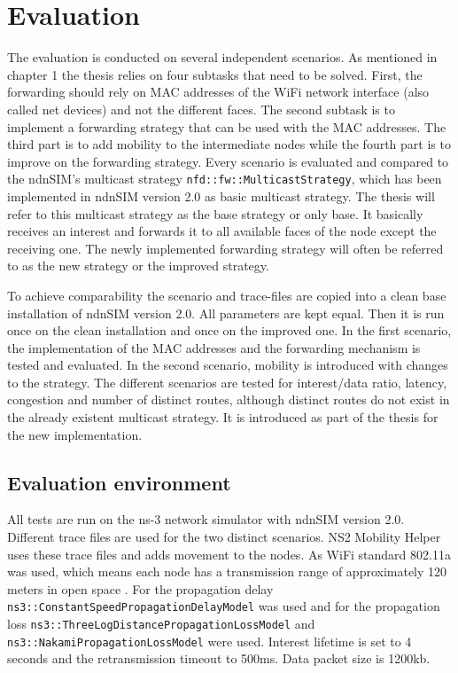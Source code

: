 \chapter{Evaluation}

The evaluation is conducted on several independent scenarios. As mentioned in chapter 1 the thesis relies on four subtasks that need to be solved. First, the forwarding should rely on MAC addresses of the WiFi network interface (also called net devices) and not the different faces. The second subtask is to implement a forwarding strategy that can be used with the MAC addresses. The third part is to add mobility to the intermediate nodes while the fourth part is to improve on the forwarding strategy. Every scenario is evaluated and compared to the ndnSIM's multicast strategy \texttt{nfd::fw::MulticastStrategy}, which has been implemented in ndnSIM version 2.0 as basic multicast strategy. The thesis will refer to this multicast strategy as the base strategy or only base. It basically receives an interest and forwards it to all available faces of the node except the receiving one. The newly implemented forwarding strategy will often be referred to as the new strategy or the improved strategy.

To achieve comparability the scenario and trace-files are copied into a clean base installation of ndnSIM version 2.0. All parameters are kept equal. Then it is run once on the clean installation and once on the improved one. In the first scenario, the implementation of the MAC addresses and the forwarding mechanism is tested and evaluated. In the second scenario, mobility is introduced with changes to the strategy. The different scenarios are tested for interest/data ratio, latency, congestion and number of distinct routes, although distinct routes do not exist in the already existent multicast strategy. It is introduced as part of the thesis for the new implementation.

\section{Evaluation environment}

All tests are run on the ns-3 network simulator with ndnSIM version 2.0. Different trace files are used for the two distinct scenarios. NS2 Mobility Helper uses these trace files and adds movement to the nodes. As WiFi standard 802.11a was used, which means each node has a transmission range of approximately 120 meters in open space \cite{wifi80211a} . For the propagation delay \texttt{ns3::ConstantSpeedPropagationDelayModel} was used and for the propagation loss \texttt{ns3::ThreeLogDistancePropagationLossModel} and \texttt{ns3::NakamiPropagationLossModel} were used. Interest lifetime is set to 4 seconds and the retransmission timeout to 500ms. Data packet size is 1200kb.

